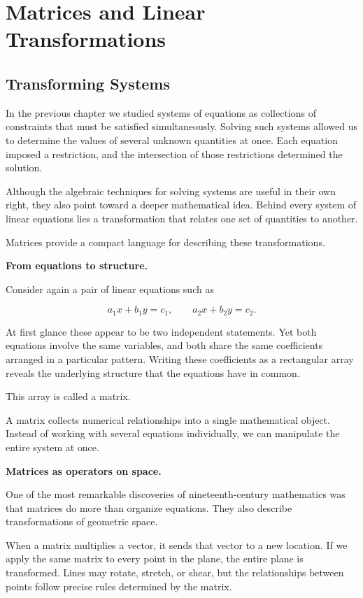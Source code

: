 \documentclass[11pt, openany]{book}
\theoremstyle{plain}
\theoremstyle{definition}
\theoremstyle{remark}
\begin{document}
\chapter{Matrices and Linear Transformations}

\section*{Transforming Systems}

In the previous chapter we studied systems of equations as collections of
constraints that must be satisfied simultaneously. Solving such systems
allowed us to determine the values of several unknown quantities at once.
Each equation imposed a restriction, and the intersection of those
restrictions determined the solution.

Although the algebraic techniques for solving systems are useful in
their own right, they also point toward a deeper mathematical idea.
Behind every system of linear equations lies a transformation that
relates one set of quantities to another.

Matrices provide a compact language for describing these transformations.

\medskip

\textbf{From equations to structure.}

Consider again a pair of linear equations such as

\[
a_1x + b_1y = c_1,
\qquad
a_2x + b_2y = c_2 .
\]

At first glance these appear to be two independent statements. Yet both
equations involve the same variables, and both share the same
coefficients arranged in a particular pattern. Writing these coefficients
as a rectangular array reveals the underlying structure that the
equations have in common.

This array is called a matrix.

A matrix collects numerical relationships into a single mathematical
object. Instead of working with several equations individually, we can
manipulate the entire system at once.

\medskip

\textbf{Matrices as operators on space.}

One of the most remarkable discoveries of nineteenth-century mathematics
was that matrices do more than organize equations. They also describe
transformations of geometric space.

When a matrix multiplies a vector, it sends that vector to a new
location. If we apply the same matrix to every point in the plane, the
entire plane is transformed. Lines may rotate, stretch, or shear, but
the relationships between points follow precise rules determined by the
matrix.
\end{document}
